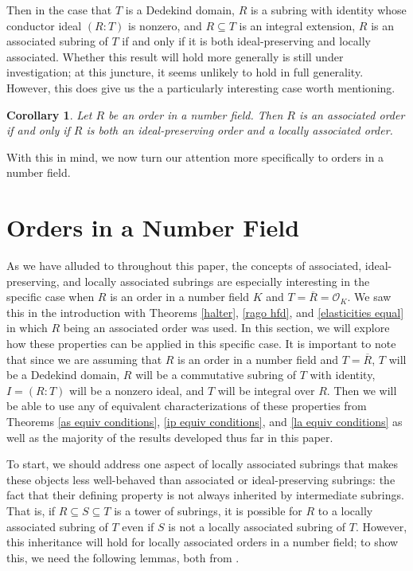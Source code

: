 \documentclass[12pt]{amsart}
\newtheorem{corollary}[theorem]{Corollary}
\theoremstyle{definition}
\newcommand{\Rbar}{\overline{R}}
\newcommand{\cO}{\mathcal{O}}
\begin{document}
	Then in the case that $T$ is a Dedekind domain, $R$ is a subring with identity whose conductor ideal $(R:T)$ is nonzero, and $R\subseteq T$ is an integral extension, $R$ is an associated subring of $T$ if and only if it is both ideal-preserving and locally associated. Whether this result will hold more generally is still under investigation; at this juncture, it seems unlikely to hold in full generality. However, this does give us the a particularly interesting case worth mentioning.
	
	\begin{corollary}
		\label{ao iff ipo and lao}
		Let $R$ be an order in a number field. Then $R$ is an associated order if and only if $R$ is both an ideal-preserving order and a locally associated order.
	\end{corollary}
	
	With this in mind, we now turn our attention more specifically to orders in a number field.
	
	\section{Orders in a Number Field}
	As we have alluded to throughout this paper, the concepts of associated, ideal-preserving, and locally associated subrings are especially interesting in the specific case when $R$ is an order in a number field $K$ and $T=\Rbar=\cO_K$. We saw this in the introduction with Theorems \ref{halter}, \ref{rago hfd}, and \ref{elasticities equal} in which $R$ being an associated order was used. In this section, we will explore how these properties can be applied in this specific case. It is important to note that since we are assuming that $R$ is an order in a number field and $T=\Rbar$, $T$ will be a Dedekind domain, $R$ will be a commutative subring of $T$ with identity, $I=(R:T)$ will be a nonzero ideal, and $T$ will be integral over $R$. Then we will be able to use any of equivalent characterizations of these properties from Theorems \ref{as equiv conditions}, \ref{ip equiv conditions}, and \ref{la equiv conditions} as well as the majority of the results developed thus far in this paper.
	
	To start, we should address one aspect of locally associated subrings that makes these objects less well-behaved than associated or ideal-preserving subrings: the fact that their defining property is not always inherited by intermediate subrings. That is, if $R\subseteq S\subseteq T$ is a tower of subrings, it is possible for $R$ to a locally associated subring of $T$ even if $S$ is not a locally associated subring of $T$. However, this inheritance will hold for locally associated orders in a number field; to show this, we need the following lemmas, both from \cite{conrad}.
	
\end{document}

